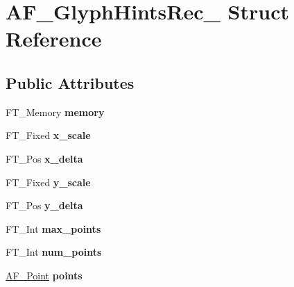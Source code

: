 \hypertarget{struct_a_f___glyph_hints_rec__}{}\section{A\+F\+\_\+\+Glyph\+Hints\+Rec\+\_\+ Struct Reference}
\label{struct_a_f___glyph_hints_rec__}
\subsection*{Public Attributes}
\begin{DoxyCompactItemize}
\item 
\mbox{\label{struct_a_f___glyph_hints_rec___a1f7353d9cd7c324d9c60a40233c5705b}} 
F\+T\+\_\+\+Memory {\bfseries memory}
\item 
\mbox{\label{struct_a_f___glyph_hints_rec___af31b148e7250e634571f9ebe5b041f48}} 
F\+T\+\_\+\+Fixed {\bfseries x\+\_\+scale}
\item 
\mbox{\label{struct_a_f___glyph_hints_rec___adfffd305a43f0014279d434bebcec2e9}} 
F\+T\+\_\+\+Pos {\bfseries x\+\_\+delta}
\item 
\mbox{\label{struct_a_f___glyph_hints_rec___a7cf24284c694b4fd858ab2f726adc79b}} 
F\+T\+\_\+\+Fixed {\bfseries y\+\_\+scale}
\item 
\mbox{\label{struct_a_f___glyph_hints_rec___a4f53f29688ebc335e66cdd97e6173462}} 
F\+T\+\_\+\+Pos {\bfseries y\+\_\+delta}
\item 
\mbox{\label{struct_a_f___glyph_hints_rec___abc37a4dc856dc530fd8dc59bacc2e25d}} 
F\+T\+\_\+\+Int {\bfseries max\+\_\+points}
\item 
\mbox{\label{struct_a_f___glyph_hints_rec___a24c61c1254ffeaf1d2da793a1e850da1}} 
F\+T\+\_\+\+Int {\bfseries num\+\_\+points}
\item 
\mbox{\label{struct_a_f___glyph_hints_rec___ad4b6bbe17871f9c1e1d505a19a284d92}} 
\hyperlink{struct_a_f___point_rec__}{A\+F\+\_\+\+Point} {\bfseries points}

\end{DoxyCompactItemize}
